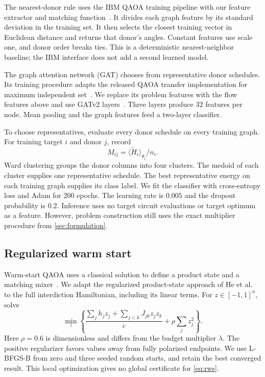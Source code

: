 \documentclass[review,onefignum,onetabnum]{siamart171218}
\begin{document}
The nearest-donor rule uses the IBM QAOA training pipeline with our feature extractor and matching function~\cite{ibmpipeline}.
It divides each graph feature by its standard deviation in the training set.
It then selects the closest training vector in Euclidean distance and returns that donor's angles.
Constant features use scale one, and donor order breaks ties.
This is a deterministic nearest-neighbor baseline; the IBM interface does not add a second learned model.

The graph attention network (GAT) chooses from representative donor schedules.
Its training procedure adapts the released QAOA transfer implementation for maximum independent set~\cite{gattransfer}.
We replace its problem features with the flow features above and use GATv2 layers~\cite{brody2022}.
Three layers produce 32 features per node.
Mean pooling and the graph features feed a two-layer classifier.

To choose representatives, evaluate every donor schedule on every training graph.
For training target $i$ and donor $j$, record
\begin{equation}\label{eq:profile}
 M_{ij}=\langle\widetilde H_i\rangle_{\theta_j}/n_i.
\end{equation}
Ward clustering groups the donor columns into four clusters.
The medoid of each cluster supplies one representative schedule.
The best representative energy on each training graph supplies its class label.
We fit the classifier with cross-entropy loss and Adam for 200 epochs.
The learning rate is $0.005$ and the dropout probability is $0.2$.
Inference uses no target circuit evaluations or target optimum as a feature.
However, problem construction still uses the exact multiplier procedure from \cref{sec:formulation}.

\subsection{Regularized warm start}
Warm-start QAOA uses a classical solution to define a product state and a matching mixer~\cite{egger2021}.
We adapt the regularized product-state approach of He et al.~\cite{he2026} to the full interdiction Hamiltonian, including its linear terms.
For $z\in[-1,1]^n$, solve
\begin{equation}\label{eq:rws}
 \min_z\left\{
  \frac{\sum_jh_jz_j+\sum_{j<k}J_{jk}z_jz_k}{c}
  +\rho\sum_jz_j^2\right\}.
\end{equation}
Here $\rho=0.6$ is dimensionless and differs from the budget multiplier $\lambda$.
The positive regularizer favors values away from fully polarized endpoints.
We use L-BFGS-B from zero and three seeded random starts, and retain the best converged result.
This local optimization gives no global certificate for \cref{eq:rws}.
\end{document}
